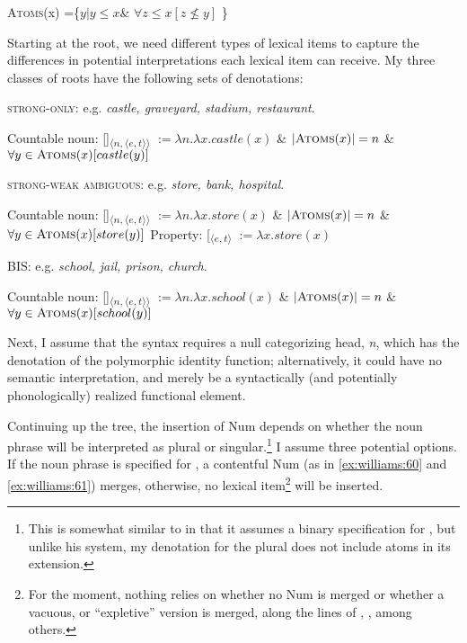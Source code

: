\documentclass[output=paper,
modfonts
]{langscibook}
\begin{document}
\begin{exe}
	\ex \textsc{Atoms}(x) =\big\{$ y| y \leq x$\& $\forall z \leq x [ z \nleq  y ]$ \big\} \citep{Ouwayda2014}
\end{exe}

Starting at the root, we need different types of lexical items to capture the differences in potential interpretations each lexical item can receive. My three classes of roots have the following sets of denotations:

\begin{exe}
\ex \textsc{strong-only}: e.g. \textit{castle, graveyard, stadium, restaurant}.
	\begin{xlist}
	\ex Countable noun: [\!]\textsubscript{$\langle n, \langle e,t \rangle \rangle$}  $:= \lambda n.\lambda x. castle(x)$ \& $ \left|\textsc{Atoms}(x)\right| = n $ \& $ \forall y \in \textsc{Atoms}(x)[ castle(y) ]$
    \end{xlist}
\ex \textsc{strong-weak ambiguous}: e.g. \textit{store, bank, hospital}.
    \begin{xlist}
    \ex Countable noun: [\!]\textsubscript{$\langle n, \langle e,t \rangle \rangle$}  $:= \lambda n.\lambda x. store(x)$ \& $ \left|\textsc{Atoms}(x)\right| = n $ \& $ \forall y \in \textsc{Atoms}(x)[ store(y) ]$
	\ex Property: [\textsubscript{$\langle e,t \rangle$}  $:= \lambda x. store(x)$ 
    \end{xlist}
\ex \textsc{BIS}: e.g. \textit{school, jail, prison, church}.
    \begin{xlist}
		\ex Countable noun: [\!]\textsubscript{$\langle n, \langle e,t \rangle \rangle$}  $:= \lambda n.\lambda x. school(x)$ \& $ \left|\textsc{Atoms}(x)\right| = n $ \& $ \forall y \in \textsc{Atoms}(x)[ school(y) ]$
		\label{ex:williams:58}
    \end{xlist}
	\end{exe}

Next, I assume that the syntax requires a null categorizing head, \textit{n}, which has the denotation of the polymorphic identity function; alternatively, it could have no semantic interpretation, and merely be a syntactically (and potentially phonologically) realized functional element. 

Continuing up the tree, the insertion of Num depends on whether the noun phrase will be interpreted as plural or singular.\footnote{This is somewhat similar to \citet{sauerland2003} in that it assumes a binary specification for , but unlike his system, my denotation for the plural does not include atoms in its extension.} I assume three potential options. If the noun phrase is specified for , a contentful Num (as in \ref{ex:williams:60} and \ref{ex:williams:61}) merges, otherwise, no lexical item\footnote{For the moment, nothing relies on whether no Num is merged or whether a vacuous, or ``expletive'' version is merged, along the lines of \citet{Wood2012}, \citet{myler2014}, among others.} will be inserted.
\end{document}
